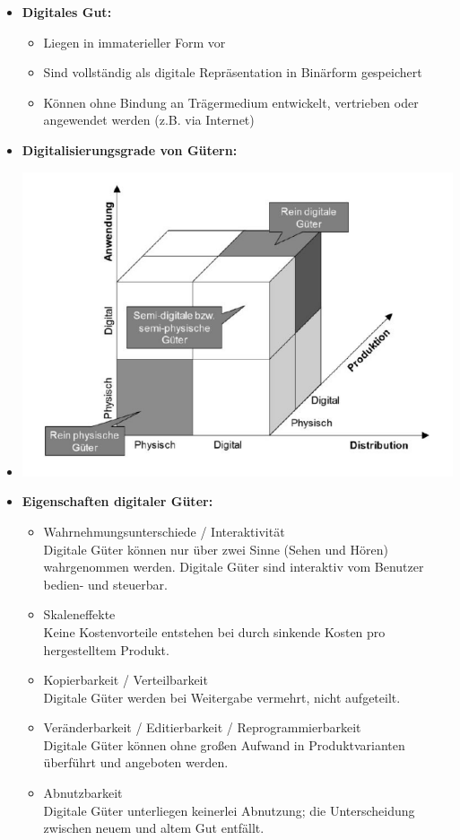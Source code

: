 \documentclass[12pt,a4paper]{article}
\begin{document}
\begin{itemize}
   \item \textbf{Digitales Gut:}
         \begin{itemize}
            \item Liegen in immaterieller Form vor
            \item Sind vollständig als digitale Repräsentation in Binärform gespeichert
            \item Können ohne Bindung an Trägermedium entwickelt, vertrieben oder angewendet werden (z.B. via Internet)
         \end{itemize}

   \item \textbf{Digitalisierungsgrade von Gütern:}
   \item[] \includegraphics[scale=0.35]{wuerfel.png}
   
   \item \textbf{Eigenschaften digitaler Güter:}
         \begin{itemize}
            \item Wahrnehmungsunterschiede / Interaktivität\\
                  Digitale Güter können nur über zwei Sinne (Sehen und Hören) wahrgenommen werden.
                  Digitale Güter sind interaktiv vom Benutzer bedien- und steuerbar.
            \item Skaleneffekte\\
                  Keine Kostenvorteile entstehen bei durch sinkende Kosten pro hergestelltem Produkt.
            \item Kopierbarkeit / Verteilbarkeit\\
                  Digitale Güter werden bei Weitergabe vermehrt, nicht aufgeteilt.
            \item Veränderbarkeit / Editierbarkeit / Reprogrammierbarkeit\\
                  Digitale Güter können ohne großen Aufwand in Produktvarianten überführt und angeboten werden.
            \item Abnutzbarkeit\\
                  Digitale Güter unterliegen keinerlei Abnutzung; die Unterscheidung zwischen neuem und altem Gut entfällt.
         \end{itemize}


\end{itemize}
\end{document}
